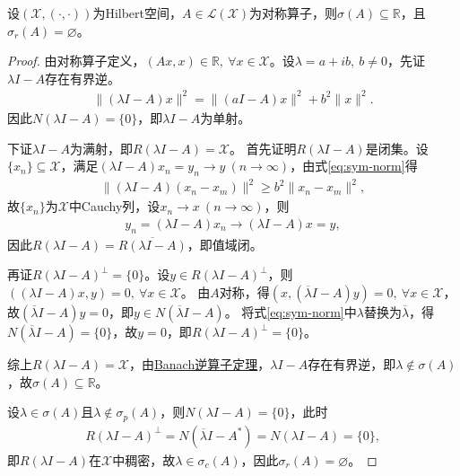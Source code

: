 \documentclass[../../main.tex]{subfiles}%
\begin{document}
\begin{proposition}
设$(\mathscr{X},(\cdot,\cdot))$为Hilbert空间，$A\in\mathscr{L}(\mathscr{X})$为对称算子，则$\sigma(A)\subseteq\mathbb{R}$，且$\sigma_r(A)=\varnothing $。
\end{proposition}
\begin{proof}
由对称算子定义，$(Ax,x)\in\mathbb{R},\ \forall x\in\mathscr{X}$。设$\lambda=a+ib,\ b\neq0$，先证$\lambda I-A$存在有界逆。
\begin{align}
\|(\lambda I-A)x\|^2=\|(aI-A)x\|^2+b^2\|x\|^2.
\label{eq:sym-norm}
\end{align}
因此$N(\lambda I-A)=\{0\}$，即$\lambda I-A$为单射。

下证$\lambda I-A$为满射，即$R(\lambda I-A)=\mathscr{X}$。
首先证明$R(\lambda I-A)$是闭集。设$\{x_n\}\subseteq\mathscr{X}$，满足$(\lambda I-A)x_n=y_n\to y\ (n\to\infty)$，由式\eqref{eq:sym-norm}得
\begin{align*}
\|(\lambda I-A)(x_n-x_m)\|^2\geqslant b^2\|x_n-x_m\|^2,
\end{align*}
故$\{x_n\}$为$\mathscr{X}$中Cauchy列，设$x_n\to x\ (n\to\infty)$，则
\begin{align*}
y_n=(\lambda I-A)x_n\to(\lambda I-A)x=y,
\end{align*}
因此$R(\lambda I-A)=\overline{R(\lambda I-A)}$，即值域闭。

再证$R(\lambda I-A)^{\perp}=\{0\}$。设$y\in R(\lambda I-A)^{\perp}$，则$((\lambda I-A)x,y)=0,\ \forall x\in\mathscr{X}$。
由$A$对称，得$(x,(\overline{\lambda}I-A)y)=0,\ \forall x\in\mathscr{X}$，故$(\overline{\lambda}I-A)y=0$，即$y\in N(\overline{\lambda}I-A)$。
将式\eqref{eq:sym-norm}中$\lambda$替换为$\overline{\lambda}$，得$N(\overline{\lambda}I-A)=\{0\}$，故$y=0$，即$R(\lambda I-A)^{\perp}=\{0\}$。

综上$R(\lambda I-A)=\mathscr{X}$，由\hyperref[theorem:泛函分析--Banach逆算子定理]{Banach逆算子定理}，$\lambda I-A$存在有界逆，即$\lambda\notin\sigma(A)$，故$\sigma(A)\subseteq\mathbb{R}$。

设$\lambda\in\sigma(A)$且$\lambda\notin\sigma_p(A)$，则$N(\lambda I-A)=\{0\}$，此时
\begin{align*}
R(\lambda I-A)^{\perp}=N(\overline{\lambda}I-A^*)=N(\lambda I-A)=\{0\},
\end{align*}
即$R(\lambda I-A)$在$\mathscr{X}$中稠密，故$\lambda\in\sigma_c(A)$，因此$\sigma_r(A)=\varnothing $。
\end{proof}
\end{document}
